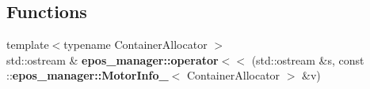 \subsection*{\-Functions}
\begin{DoxyCompactItemize}
\item 
{\footnotesize template$<$typename Container\-Allocator $>$ }\\std\-::ostream \& {\bf epos\-\_\-manager\-::operator$<$$<$} (std\-::ostream \&s, const \-::{\bf epos\-\_\-manager\-::\-Motor\-Info\-\_\-}$<$ \-Container\-Allocator $>$ \&v)
\end{DoxyCompactItemize}
